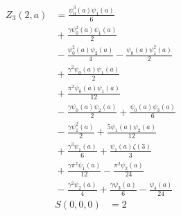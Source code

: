 \[
\begin{aligned}
Z_{3}(2,a) &={} \frac{\psi_{0}^{3}{\left(a \right)} \psi_{1}{\left(a \right)}}{6}\\
&{} + \frac{\gamma \psi_{0}^{2}{\left(a \right)} \psi_{1}{\left(a \right)}}{2}\\
&{} - \frac{\psi_{0}^{2}{\left(a \right)} \psi_{2}{\left(a \right)}}{4} - \frac{\psi_{0}{\left(a \right)} \psi_{1}^{2}{\left(a \right)}}{2}\\
&{} + \frac{\gamma^{2} \psi_{0}{\left(a \right)} \psi_{1}{\left(a \right)}}{2}\\
&{} + \frac{\pi^{2} \psi_{0}{\left(a \right)} \psi_{1}{\left(a \right)}}{12}\\
&{} - \frac{\gamma \psi_{0}{\left(a \right)} \psi_{2}{\left(a \right)}}{2} + \frac{\psi_{0}{\left(a \right)} \psi_{3}{\left(a \right)}}{6}\\
&{} - \frac{\gamma \psi_{1}^{2}{\left(a \right)}}{2} + \frac{5 \psi_{1}{\left(a \right)} \psi_{2}{\left(a \right)}}{12}\\
&{} + \frac{\gamma^{3} \psi_{1}{\left(a \right)}}{6} + \frac{\psi_{1}{\left(a \right)} \zeta\left(3\right)}{3}\\
&{} + \frac{\gamma \pi^{2} \psi_{1}{\left(a \right)}}{12} - \frac{\pi^{2} \psi_{2}{\left(a \right)}}{24}\\
&{} - \frac{\gamma^{2} \psi_{2}{\left(a \right)}}{4} + \frac{\gamma \psi_{3}{\left(a \right)}}{6} - \frac{\psi_{4}{\left(a \right)}}{24}
\end{aligned}
\]
\[
\begin{aligned}
S(0,0,0) &={} 2
\end{aligned}
\]
